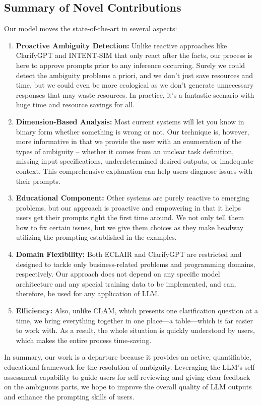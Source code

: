 \documentclass[11pt,a4paper]{article}
\begin{document}
\subsection{Summary of Novel Contributions}
Our model moves the state-of-the-art in several aspects:
\begin{enumerate}
    \item \textbf{Proactive Ambiguity Detection:} Unlike reactive approaches like ClarifyGPT and INTENT-SIM that only react after the facts, our process is here to approve prompts prior to any inference occurring. Surely we could detect the ambiguity problems a priori, and we don't just save resources and time, but we could even be more ecological as we don't generate unnecessary responses that may waste resources. In practice, it’s a fantastic scenario with huge time and resource savings for all.
    \item \textbf{Dimension-Based Analysis:} Most current systems will let you know in binary form whether something is wrong or not. Our technique is, however, more informative in that we provide the user with an enumeration of the types of ambiguity – whether it comes from an unclear task definition, missing input specifications, underdetermined desired outputs, or inadequate context. This comprehensive explanation can help users diagnose issues with their prompts.
    \item \textbf{Educational Component:} Other systems are purely reactive to emerging problems, but our approach is proactive and empowering in that it helps users get their prompts right the first time around. We not only tell them how to fix certain issues, but we give them choices as they make headway utilizing the prompting established in the examples.
    \item \textbf{Domain Flexibility:} Both ECLAIR and ClarifyGPT are restricted and designed to tackle only business-related problems and programming domains, respectively. Our approach does not depend on any specific model architecture and any special training data to be implemented, and can, therefore, be used for any application of LLM.
    \item \textbf{Efficiency:} Also, unlike CLAM, which presents one clarification question at a time, we bring everything together in one place—a table—which is far easier to work with. As a result, the whole situation is quickly understood by users, which makes the entire process time-saving.
\end{enumerate}
In summary, our work is a departure because it provides an active, quantifiable, educational framework for the resolution of ambiguity. Leveraging the LLM's self-assessment capability to guide users for self-reviewing and giving clear feedback on the ambiguous parts, we hope to improve the overall quality of LLM outputs and enhance the prompting skills of users.
\end{document}
